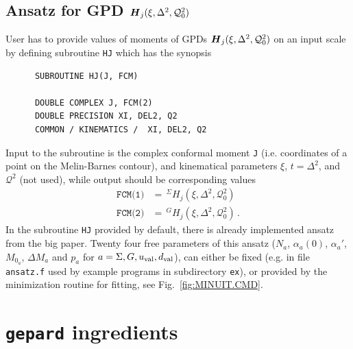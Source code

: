 \documentclass[12pt]{article}
\begin{document}
\subsection{Ansatz for GPD $\mbox{\boldmath $H$}_{j} (\xi,\Delta^2,\mathcal{Q}_{0}^2)$}
\label{ssect:ansatz}

User has to provide values of moments of GPDs $\mbox{\boldmath $H$}_{j} 
(\xi,\Delta^2,\mathcal{Q}_{0}^2)$
on an input scale by defining subroutine \texttt{HJ} which has the synopsis
\begin{verbatim}
      SUBROUTINE HJ(J, FCM)

      DOUBLE COMPLEX J, FCM(2)
      DOUBLE PRECISION XI, DEL2, Q2
      COMMON / KINEMATICS /  XI, DEL2, Q2
\end{verbatim}
Input to the subroutine is the complex conformal moment \texttt{J} (i.e. coordinates of a point
on the Melin-Barnes contour), and kinematical parameters $\xi$, $t=\Delta^2$, and $\mathcal{Q}^2$
(not used), while output should be corresponding values
\begin{align}
\texttt{FCM(1)}& =\, ^{\Sigma}\!H_{j} (\xi,\Delta^2,\mathcal{Q}_{0}^2)  \\
\texttt{FCM(2)}& =\, ^{G}\!H_{j}(\xi,\Delta^2,\mathcal{Q}_{0}^2) \,.
\label{eq:FCM}
\end{align}
In the subroutine \texttt{HJ} provided by default, there is already implemented ansatz
from the big paper.
Twenty four free parameters of this ansatz ($N_a$, $\alpha_{a}(0)$, $\alpha_{a}'$,
$M_{0_a}$, $\Delta M_a$ and $p_a$ for  $a = \Sigma, G, u_{\rm val}, d_{\rm val}$),
can either be fixed (e.g. in file \texttt{ansatz.f} used by example programs in
subdirectory \texttt{ex}), or provided by the minimization routine for fitting, see
Fig.~\ref{fig:MINUIT.CMD}.


\section{\texttt{gepard} ingredients}
\end{document}
